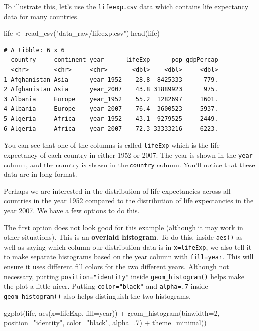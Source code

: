 \documentclass[
  letterpaper,
  DIV=11,
  numbers=noendperiod]{scrreprt}
\newenvironment{Shaded}{\begin{snugshade}}{\end{snugshade}}
\newcommand{\AttributeTok}[1]{\textcolor[rgb]{0.40,0.45,0.13}{#1}}
\newcommand{\DecValTok}[1]{\textcolor[rgb]{0.68,0.00,0.00}{#1}}
\newcommand{\FunctionTok}[1]{\textcolor[rgb]{0.28,0.35,0.67}{#1}}
\newcommand{\NormalTok}[1]{\textcolor[rgb]{0.00,0.23,0.31}{#1}}
\newcommand{\OtherTok}[1]{\textcolor[rgb]{0.00,0.23,0.31}{#1}}
\newcommand{\SpecialCharTok}[1]{\textcolor[rgb]{0.37,0.37,0.37}{#1}}
\newcommand{\StringTok}[1]{\textcolor[rgb]{0.13,0.47,0.30}{#1}}
\begin{document}
To illustrate this, let's use the \texttt{lifeexp.csv} data which
contains life expectancy data for many countries.

\begin{Shaded}
\begin{Highlighting}[]
\NormalTok{life }\OtherTok{\textless{}{-}} \FunctionTok{read\_csv}\NormalTok{(}\StringTok{"data\_raw/lifeexp.csv"}\NormalTok{)}
\FunctionTok{head}\NormalTok{(life)}
\end{Highlighting}
\end{Shaded}

\begin{verbatim}
# A tibble: 6 x 6
  country     continent year      lifeExp      pop gdpPercap
  <chr>       <chr>     <chr>       <dbl>    <dbl>     <dbl>
1 Afghanistan Asia      year_1952    28.8  8425333      779.
2 Afghanistan Asia      year_2007    43.8 31889923      975.
3 Albania     Europe    year_1952    55.2  1282697     1601.
4 Albania     Europe    year_2007    76.4  3600523     5937.
5 Algeria     Africa    year_1952    43.1  9279525     2449.
6 Algeria     Africa    year_2007    72.3 33333216     6223.
\end{verbatim}

You can see that one of the columns is called \texttt{lifeExp} which is
the life expectancy of each country in either 1952 or 2007. The year is
shown in the \texttt{year} column, and the country is shown in the
\texttt{country} column. You'll notice that these data are in long
format.

Perhaps we are interested in the distribution of life expectancies
across all countries in the year 1952 compared to the distribution of
life expectancies in the year 2007. We have a few options to do this.

The first option does not look good for this example (although it may
work in other situations). This is an \textbf{overlaid histogram}. To do
this, inside \texttt{aes()} as well as saying which column our
distribution data is in \texttt{x=lifeExp}, we also tell it to make
separate histograms based on the year column with \texttt{fill=year}.
This will ensure it uses different fill colors for the two different
years. Although not necessary, putting \texttt{position="identity"}
inside \texttt{geom\_histogram()} helps make the plot a little nicer.
Putting \texttt{color="black"} and \texttt{alpha=.7} inside
\texttt{geom\_histogram()} also helps distinguish the two histograms.

\begin{Shaded}
\begin{Highlighting}[]
\FunctionTok{ggplot}\NormalTok{(life, }\FunctionTok{aes}\NormalTok{(}\AttributeTok{x=}\NormalTok{lifeExp, }\AttributeTok{fill=}\NormalTok{year)) }\SpecialCharTok{+}  
  \FunctionTok{geom\_histogram}\NormalTok{(}\AttributeTok{binwidth=}\DecValTok{2}\NormalTok{, }\AttributeTok{position=}\StringTok{"identity"}\NormalTok{, }\AttributeTok{color=}\StringTok{"black"}\NormalTok{, }\AttributeTok{alpha=}\NormalTok{.}\DecValTok{7}\NormalTok{) }\SpecialCharTok{+}
  \FunctionTok{theme\_minimal}\NormalTok{()}
\end{Highlighting}
\end{Shaded}
\end{document}
